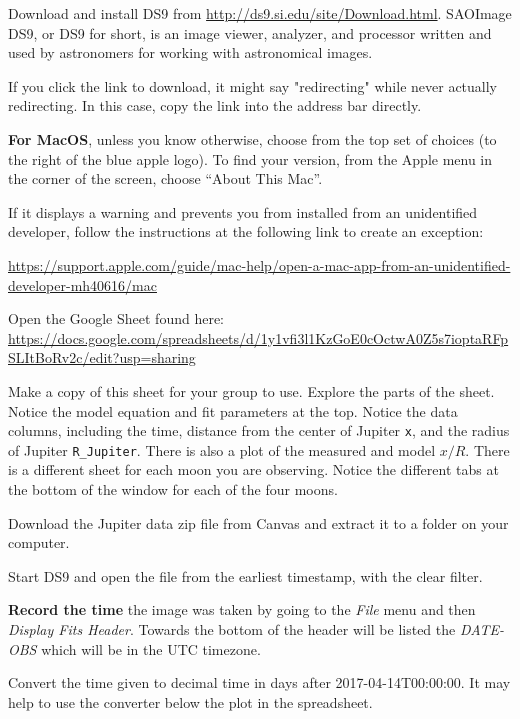 \begin{steps}
	
	\item Download and install DS9 from \url{http://ds9.si.edu/site/Download.html}. SAOImage DS9, or DS9 for short, is an image viewer, analyzer, and processor written and used by astronomers for working with astronomical images.
	
	If you click the link to download, it might say "redirecting" while never actually redirecting. In this case, copy the link into the address bar directly.
	\begin{framed}	
		\textbf{For MacOS}, unless you know otherwise, choose from the top set of choices (to the right of
		the blue apple logo). To find your version, from the Apple menu in the corner of the screen,
		choose “About This Mac”.
		
		If it displays a warning and prevents you from installed from an unidentified developer, follow the instructions at the following link to create an exception:
		
		\url{https://support.apple.com/guide/mac-help/open-a-mac-app-from-an-unidentified-developer-mh40616/mac}
	\end{framed}

	\item Open the Google Sheet found here: \url{https://docs.google.com/spreadsheets/d/1y1vfi3l1KzGoE0cOctwA0Z5s7ioptaRFpSLItBoRv2c/edit?usp=sharing}
	
	\item Make a copy of this sheet for your group to use. Explore the parts of the sheet. Notice the model equation and fit parameters at the top. Notice the data columns, including the time, distance from the center of Jupiter \texttt{x}, and the radius of Jupiter \texttt{R\_Jupiter}. There is also a plot of the measured and model $x/R$. There is a different sheet for each moon you are observing. Notice the different tabs at the bottom of the window for each of the four moons.
	
	\item Download the Jupiter data zip file from Canvas and extract it to a folder on your computer.
	
	\item Start DS9 and open the file from the earliest timestamp, with the clear filter.
	
	\item \textbf{Record the time} the image was taken by going to the \textit{File} menu and then \textit{Display Fits Header}. Towards the bottom of the header will be listed the \textit{DATE-OBS} which will be in the UTC timezone.
	
	\item Convert the time given to decimal time in days after 2017-04-14T00:00:00. It may help to use the converter below the plot in the spreadsheet.
\end{steps}

